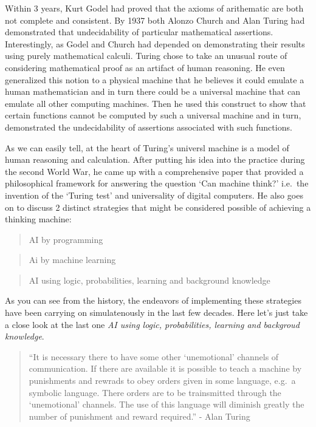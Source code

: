 \documentclass[]{book}
\theoremstyle{definition}
\theoremstyle{definition}
\theoremstyle{definition}
\theoremstyle{remark}
\begin{document}
Within 3 years, Kurt Godel had proved that the axioms of arithematic are
both not complete and consistent. By 1937 both Alonzo Church and Alan
Turing had demonstrated that undecidability of particular mathematical
assertions. Interestingly, as Godel and Church had depended on
demonstrating their results using purely mathematical calculi. Turing
chose to take an unusual route of considering mathematical proof as an
artifact of human reasoning. He even generalized this notion to a
physical machine that he believes it could emulate a human mathematician
and in turn there could be a universal machine that can emulate all
other computing machines. Then he used this construct to show that
certain functions cannot be computed by such a universal machine and in
turn, demonstrated the undecidability of assertions associated with such
functions.

As we can easily tell, at the heart of Turing's universl machine is a
model of human reasoning and calculation. After putting his idea into
the practice during the second World War, he came up with a
comprehensive paper that provided a philosophical framework for
answering the question `Can machine think?' i.e.~the invention of the
`Turing test' and universality of digital computers. He also goes on to
discuss 2 distinct strategies that might be considered possible of
achieving a thinking machine:

\begin{quote}
AI by programming
\end{quote}

\begin{quote}
Ai by machine learning
\end{quote}

\begin{quote}
AI using logic, probabilities, learning and background knowledge
\end{quote}

As you can see from the history, the endeavors of implementing these
strategies have been carrying on simulatenously in the last few decades.
Here let's just take a close look at the last one \emph{AI using logic,
probabilities, learning and backgroud knowledge}.

\begin{quote}
``It is necessary there to have some other `unemotional' channels of
communication. If there are available it is possible to teach a machine
by punishments and rewrads to obey orders given in some language, e.g.~a
symbolic language. There orders are to be trainsmitted through the
`unemotional' channels. The use of this language will diminish greatly
the number of punishment and reward required.'' - Alan Turing
\end{quote}
\end{document}
